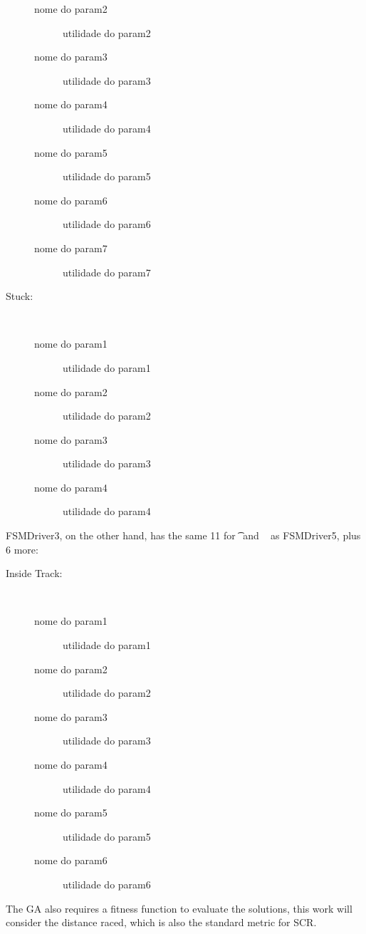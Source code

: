 \begin{description}
\begin{description}
		\item[nome do param2] utilidade do param2
		\item[nome do param3] utilidade do param3
		\item[nome do param4] utilidade do param4
		\item[nome do param5] utilidade do param5
		\item[nome do param6] utilidade do param6
		\item[nome do param7] utilidade do param7
	\end{description}
	\item[Stuck:] \ %
	\begin{description}
		\item[nome do param1] utilidade do param1
		\item[nome do param2] utilidade do param2
		\item[nome do param3] utilidade do param3
		\item[nome do param4] utilidade do param4
	\end{description}
\end{description}

FSMDriver3, on the other hand, has the same 11 for \t~and \St~ as FSMDriver5, plus 6 more:

\begin{description}
	\item[Inside Track:] \ %
	\begin{description}
		\item[nome do param1] utilidade do param1
		\item[nome do param2] utilidade do param2
		\item[nome do param3] utilidade do param3
		\item[nome do param4] utilidade do param4
		\item[nome do param5] utilidade do param5
		\item[nome do param6] utilidade do param6
	\end{description}
\end{description}

The GA also requires a fitness function to evaluate the solutions, this work will consider the distance raced, which is also the standard metric for SCR.


